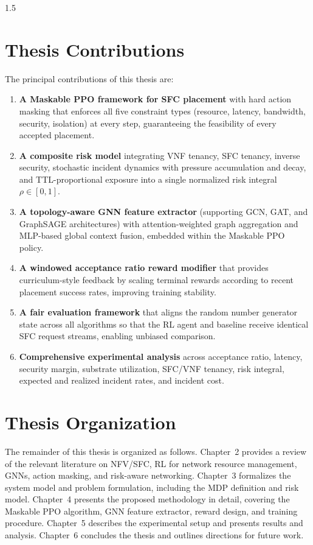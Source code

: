 \documentclass[A4paper,12pt]{report}
\theoremstyle{plain}
\theoremstyle{definition}
\theoremstyle{remark}
\numberwithin{equation}{section}
\begin{document}
\begin{spacing}{1.5}
\section{Thesis Contributions}

The principal contributions of this thesis are:

\begin{enumerate}
  \item \textbf{A Maskable PPO framework for SFC placement} with hard action masking that enforces all five constraint types (resource, latency, bandwidth, security, isolation) at every step, guaranteeing the feasibility of every accepted placement.
  \item \textbf{A composite risk model} integrating VNF tenancy, SFC tenancy, inverse security, stochastic incident dynamics with pressure accumulation and decay, and TTL-proportional exposure into a single normalized risk integral $\rho \in [0,1]$.
  \item \textbf{A topology-aware GNN feature extractor} (supporting GCN, GAT, and GraphSAGE architectures) with attention-weighted graph aggregation and MLP-based global context fusion, embedded within the Maskable PPO policy.
  \item \textbf{A windowed acceptance ratio reward modifier} that provides curriculum-style feedback by scaling terminal rewards according to recent placement success rates, improving training stability.
  \item \textbf{A fair evaluation framework} that aligns the random number generator state across all algorithms so that the RL agent and baseline receive identical SFC request streams, enabling unbiased comparison.
  \item \textbf{Comprehensive experimental analysis} across acceptance ratio, latency, security margin, substrate utilization, SFC/VNF tenancy, risk integral, expected and realized incident rates, and incident cost.
\end{enumerate}

\section{Thesis Organization}

The remainder of this thesis is organized as follows. Chapter~2 provides a review of the relevant literature on NFV/SFC, RL for network resource management, GNNs, action masking, and risk-aware networking. Chapter~3 formalizes the system model and problem formulation, including the MDP definition and risk model. Chapter~4 presents the proposed methodology in detail, covering the Maskable PPO algorithm, GNN feature extractor, reward design, and training procedure. Chapter~5 describes the experimental setup and presents results and analysis. Chapter~6 concludes the thesis and outlines directions for future work.


\end{spacing}
\end{document}
